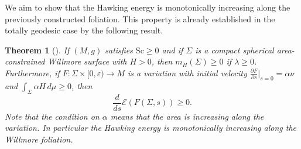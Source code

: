 \documentclass[12pt,a4paper]{amsart}
\theoremstyle{plain}
\newtheorem{theorem}{Theorem}[section]
\theoremstyle{definition}
\begin{document}
We aim to show that the Hawking energy is monotonically increasing along the previously constructed foliation. This property is already established in the totally geodesic case by the following result.
\begin{theorem}[{\cite[Theorem 4]{willflat}}]
    If \((M, g)\) satisfies \( \text{Sc} \geq 0 \) and if \( \Sigma \) is a compact spherical area-constrained Willmore surface  with \( H > 0 \), then \( m_H (\Sigma) \geq 0 \) if \( \lambda \geq 0 \). Furthermore, if \( F : \Sigma \times [0, \varepsilon) \rightarrow M \) is a variation with initial velocity \( \frac{\partial F}{\partial s} \Big|_{s=0} = \alpha \nu \) and $\int_{\Sigma} \alpha H \, d\mu \geq 0$,
then 
\[
\frac{d}{ds}  \mathcal{E}(F(\Sigma, s)) \geq 0.
\]
Note that the condition on \( \alpha \) means that the area is increasing along the variation. In particular the Hawking energy is monotonically increasing along the Willmore foliation.
\end{theorem}
\end{document}

